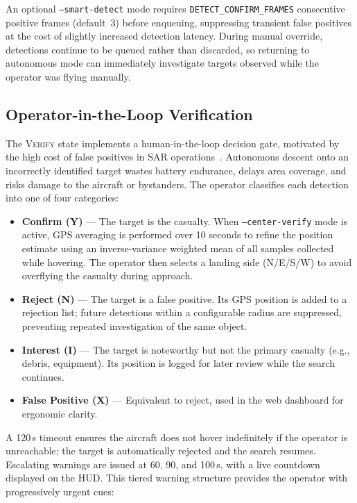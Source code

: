 An optional \texttt{--smart-detect} mode requires \texttt{DETECT\_CONFIRM\_FRAMES} consecutive positive frames (default~3) before enqueuing, suppressing transient false positives at the cost of slightly increased detection latency. During manual override, detections continue to be queued rather than discarded, so returning to autonomous mode can immediately investigate targets observed while the operator was flying manually.

\subsection{Operator-in-the-Loop Verification}\label{subsec:operator}

The \textsc{Verify} state implements a human-in-the-loop decision gate, motivated by the high cost of false positives in SAR operations~\cite{murphy2014}. Autonomous descent onto an incorrectly identified target wastes battery endurance, delays area coverage, and risks damage to the aircraft or bystanders. The operator classifies each detection into one of four categories:

\begin{itemize}
    \item \textbf{Confirm (Y)} --- The target is the casualty. When \texttt{--center-verify} mode is active, GPS averaging is performed over 10 seconds to refine the position estimate using an inverse-variance weighted mean of all samples collected while hovering. The operator then selects a landing side (N/E/S/W) to avoid overflying the casualty during approach.
    \item \textbf{Reject (N)} --- The target is a false positive. Its GPS position is added to a rejection list; future detections within a configurable radius are suppressed, preventing repeated investigation of the same object.
    \item \textbf{Interest (I)} --- The target is noteworthy but not the primary casualty (e.g., debris, equipment). Its position is logged for later review while the search continues.
    \item \textbf{False Positive (X)} --- Equivalent to reject, used in the web dashboard for ergonomic clarity.
\end{itemize}

A 120\,s timeout ensures the aircraft does not hover indefinitely if the operator is unreachable; the target is automatically rejected and the search resumes. Escalating warnings are issued at 60, 90, and 100\,s, with a live countdown displayed on the HUD. This tiered warning structure provides the operator with progressively urgent cues:

